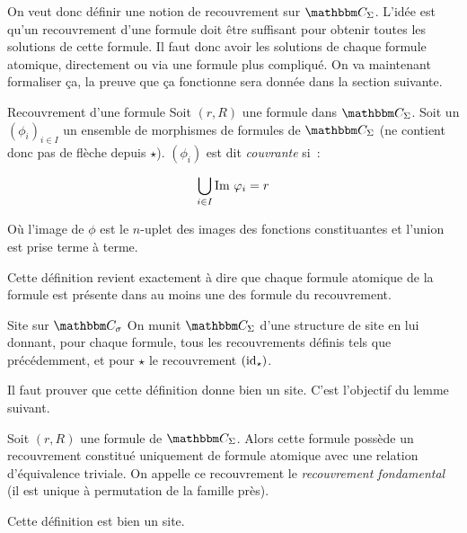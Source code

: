 On veut donc définir une notion de recouvrement sur $\C_\Sigma$. L'idée est qu'un
recouvrement d'une formule doit être suffisant pour obtenir toutes les solutions de
cette formule. Il faut donc avoir les solutions de chaque formule atomique, directement
ou via une formule plus compliqué. On va maintenant formaliser ça, la preuve que ça
fonctionne sera donnée dans la section suivante.

\begin{defi}{Recouvrement d'une formule}
    Soit $(r,R)$ une formule dans $\C_\Sigma$. Soit un $(\phi_i)_{i\in I}$ un ensemble
    de morphismes de formules de $\C_\Sigma$ (ne contient donc pas de flèche depuis
    $\star$). $(\phi_i)$ est dit \emph{couvrante} si~:

    \[ \bigcup_{i\in I} \text{Im }\varphi_i = r \]

    Où l'image de $\phi$ est le $n$-uplet des images des fonctions constituantes et
    l'union est prise terme à terme.
\end{defi}

Cette définition revient exactement à dire que chaque formule atomique de la formule est
présente dans au moins une des formule du recouvrement.

\begin{defi}{Site sur $\C_\sigma$}
    On munit $\C_\Sigma$ d'une structure de site en lui donnant, pour chaque formule,
    tous les recouvrements définis tels que précédemment, et pour $\star$ le recouvrement
    $(\operatorname{id}_\star)$.
\end{defi}

Il faut prouver que cette définition donne bien un site. C'est l'objectif du
lemme suivant.

\begin{rem}
    Soit $(r,R)$ une formule de $\C_\Sigma$. Alors cette formule possède un
    recouvrement constitué uniquement de formule atomique avec une relation d'équivalence
    triviale. On appelle ce recouvrement le \emph{recouvrement fondamental}
    (il est unique à permutation de la famille près).
\end{rem}

\begin{lem}
    Cette définition est bien un site.
\end{lem}

